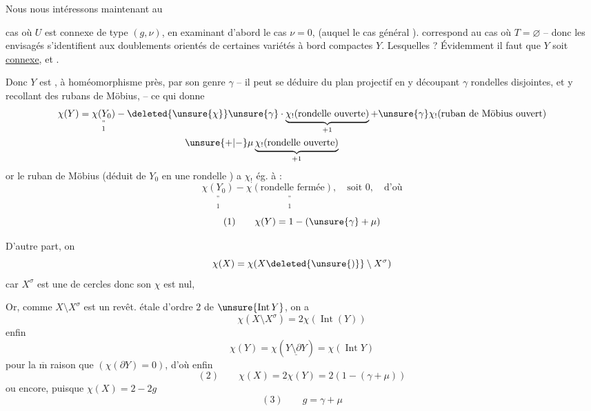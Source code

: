 Nous nous intéressons maintenant au

cas où $U$ est connexe de type $(g,\nu)$, en examinant d'abord le cas $\nu=0$,  (auquel le cas général ).   correspond au cas où $T=\varnothing$ -- donc les   envisagés  s'identifient aux doublements orientés de certaines variétés à bord compactes $Y$. Lesquelles ? Évidemment il faut que $Y$ soit \uline{connexe}, et .


Donc $Y$ est , à homéomorphisme près, par son genre $\gamma$  -- il peut se déduire du plan projectif  en y découpant $\gamma$ rondelles disjointes, et y recollant des rubans de Möbius,  -- ce qui donne
\[
\begin{aligned}
\chi(Y)&=\underset{\substack{\text{''}\\1}}{\chi(Y_0)}
-\deleted{\unsure{\chi}}\unsure{\gamma}\cdot
\underbrace{\chi_!(\text{rondelle ouverte})}_{+1}
+\unsure{\gamma}\chi_!(\text{ruban de Möbius ouvert})\\
&\hspace{11em}\unsure{+|-}\mu\underbrace{\chi_!(\text{rondelle ouverte})}_{+1}
\end{aligned}
\]
or le ruban de Möbius  (déduit de $Y_0$ en  une rondelle ) a  $\chi_!$ ég. à :
\[
\underset{\substack{\text{''}\\1}}{\chi(Y_0)}-
\underset{\substack{\text{''}\\1}}{\chi(\text{rondelle fermée})},
\quad \text{soit }0,\quad \text{d'où}
\]
\[
(1)\qquad \chi(Y)=1-(\unsure{\gamma}+\mu)
\]

D'autre part, on 
\[
\chi(X)=\chi(X\deleted{\unsure{)}}\setminus X^\sigma)
\]
car $X^\sigma$ est une  de cercles donc son $\chi$ est nul,

Or, comme $X\setminus X^\sigma$ est un revêt. étale d'ordre $2$ de $\unsure{\operatorname{Int}Y}$, on a
\[
\chi(X\setminus X^\sigma)=2\chi(\operatorname{Int}(Y))
\]
enfin
\[
\chi(Y)=\chi(\underline{Y\setminus\partial Y})=\chi(\operatorname{Int}Y)
\]
pour la $\overline{\mathrm m}$ raison que  $(\chi(\partial Y)=0)$,
d'où enfin
\[
(2)\qquad \chi(X)=2\chi(Y)=2(1-(\gamma+\mu))
\]
 ou encore, puisque $\chi(X)=2-2g$
\[
(3)\qquad g=\gamma+\mu
\]

